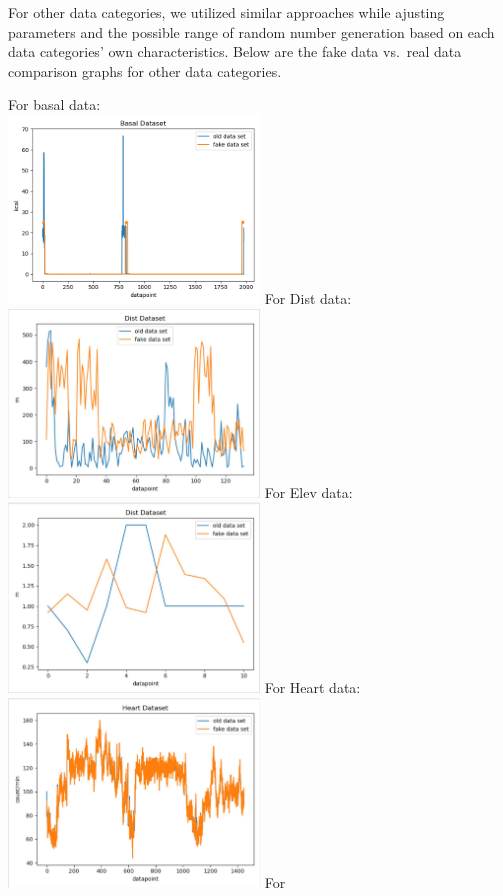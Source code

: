 \documentclass[]{book}
\begin{document}
For other data categories, we utilized similar approaches while ajusting
parameters and the possible range of random number generation based on
each data categories' own characteristics. Below are the fake data
vs.~real data comparison graphs for other data categories.

For basal data:\\
\includegraphics[width=0.50000\textwidth]{./images/BasalData.png} For
Dist data:\\
\includegraphics[width=0.50000\textwidth]{./images/Dist Data.JPG} For
Elev data:\\
\includegraphics[width=0.50000\textwidth]{./images/Elev Data.JPG} For
Heart data:\\
\includegraphics[width=0.50000\textwidth]{./images/Heart Data.JPG} For
\end{document}

